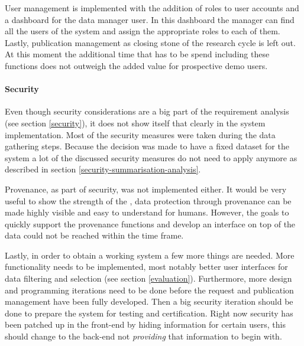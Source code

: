 User management is implemented with the addition of roles to user accounts and a dashboard for the data manager user.
In this dashboard the manager can find all the users of the system and assign the appropriate roles to each of them.
Lastly, publication management as closing stone of the research cycle is left out.
At this moment the additional time that has to be spend including these functions does not outweigh the added value for prospective demo users.

\paragraph{Security}
Even though security considerations are a big part of the requirement analysis (see section \ref{security}), it does not show itself that clearly in the system implementation.
Most of the security measures were taken during the data gathering steps.
Because the decision was made to have a fixed dataset for the system a lot of the discussed security measures do not need to apply anymore as described in section \ref{security-summarisation-analysis}.

Provenance, as part of security, was not implemented either.
It would be very useful to show the strength of the \ivfsystem{}, data protection through provenance can be made highly visible and easy to understand for humans.
However, the goals to quickly support the provenance functions and develop an interface on top of the data could not be reached within the time frame.

Lastly, in order to obtain a working system a few more things are needed.
More functionality needs to be implemented, most notably better user interfaces for data filtering and selection (see section \ref{evaluation}).
Furthermore, more design and programming iterations need to be done before the request and publication management have been fully developed.
Then a big security iteration should be done to prepare the system for testing and certification.
Right now security has been patched up in the front-end by hiding information for certain users, this should change to the back-end not \emph{providing} that information to begin with.

